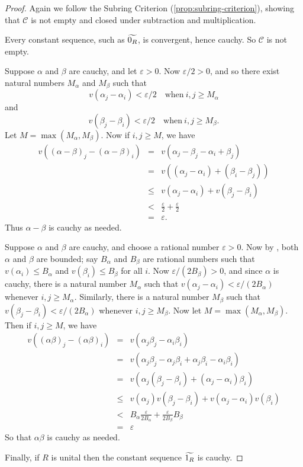 \begin{proof}
Again we follow the Subring Criterion (\ref{prop:subring-criterion}), showing that \(\mathcal{C}\) is not empty and closed under subtraction and multiplication.
\begin{inlineproplist}
\item Every constant sequence, such as \(\widetilde{0_R}\), is convergent, hence cauchy. So \(\mathcal{C}\) is not empty.
\item Suppose \(\alpha\) and \(\beta\) are cauchy, and let \(\varepsilon > 0\). Now \(\varepsilon/2 > 0\), and so there exist natural numbers \(M_\alpha\) and \(M_\beta\) such that \[ v(\alpha_j - \alpha_i) < \varepsilon/2 \quad \mathrm{when}\ i,j \geq M_\alpha \] and \[ v(\beta_j - \beta_i) < \varepsilon/2 \quad \mathrm{when}\ i,j \geq M_\beta. \] Let \(M = \max(M_\alpha, M_\beta)\). Now if \(i,j \geq M\), we have
\begin{eqnarray*}
v\left( (\alpha - \beta)_j - (\alpha - \beta)_i \right)
 & = & v(\alpha_j - \beta_j - \alpha_i + \beta_j) \\
 & = & v\left( (\alpha_j - \alpha_i) + (\beta_i - \beta_j) \right) \\
 & \leq & v(\alpha_j - \alpha_i) + v(\beta_j - \beta_i) \\
 & < & \frac{\varepsilon}{2} + \frac{\varepsilon}{2} \\
 & = & \varepsilon.
\end{eqnarray*}
Thus \(\alpha - \beta\) is cauchy as needed.
\item Suppose \(\alpha\) and \(\beta\) are cauchy, and choose a rational number \(\varepsilon > 0\). Now by , both \(\alpha\) and \(\beta\) are bounded; say \(B_\alpha\) and \(B_\beta\) are rational numbers such that \(v(\alpha_i) \leq B_\alpha\) and \(v(\beta_i) \leq B_\beta\) for all \(i\). Now \(\varepsilon/(2B_\beta) > 0\), and since \(\alpha\) is cauchy, there is a natural number \(M_\alpha\) such that \(v(\alpha_j - \alpha_i) < \varepsilon/(2B_\alpha)\) whenever \(i,j \geq M_\alpha\). Similarly, there is a natural number \(M_\beta\) such that \(v(\beta_j - \beta_i) < \varepsilon/(2B_\alpha)\) whenever \(i,j \geq M_\beta\). Now let \(M = \max(M_\alpha,M_\beta)\). Then if \(i,j \geq M\), we have
\begin{eqnarray*}
v\left((\alpha\beta)_j - (\alpha\beta)_i\right)
 & = & v(\alpha_j\beta_j - \alpha_i\beta_i) \\
 & = & v(\alpha_j\beta_j - \alpha_j\beta_i + \alpha_j\beta_i - \alpha_i\beta_i) \\
 & = & v\left( \alpha_j(\beta_j - \beta_i) + (\alpha_j - \alpha_i)\beta_i \right) \\
 & \leq & v(\alpha_j)v(\beta_j - \beta_i) + v(\alpha_j - \alpha_i)v(\beta_i) \\
 & < & B_\alpha \frac{\varepsilon}{2B_\alpha} + \frac{\varepsilon}{2B_\beta} B_\beta \\
 & = & \varepsilon
\end{eqnarray*}
So that \(\alpha\beta\) is cauchy as needed.
\end{inlineproplist}
Finally, if \(R\) is unital then the constant sequence \(\widetilde{1_R}\) is cauchy.
\end{proof}

